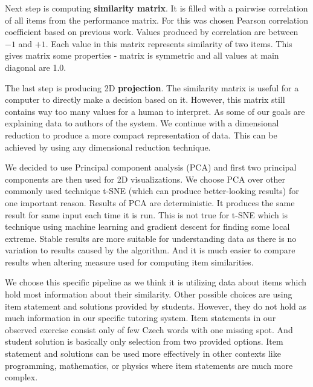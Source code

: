 \documentclass[
  digital, %
  table,   %
  nolof,     %
  nolot,     %
  nocover
]{fithesis3}
\begin{document}

Next step is computing \textbf{similarity matrix}. It is filled with a pairwise correlation of all items from the performance matrix. For this was chosen Pearson correlation coefficient based on previous work. Values produced by correlation are between $-1$ and $+1$. Each value in this matrix represents similarity of two items. This gives matrix some properties - matrix is symmetric and all values at main diagonal are 1.0.


The last step is producing 2D \textbf{projection}. The similarity matrix is useful for a computer to directly make a decision based on it. However, this matrix still contains way too many values for a human to interpret. As some of our goals are explaining data to authors of the system. We continue with a dimensional reduction to produce a more compact representation of data. This can be achieved by using any dimensional reduction technique.


We decided to use Principal component analysis (PCA) and first two principal components are then used for 2D visualizations. We choose PCA over other commonly used technique t-SNE (which can produce better-looking results) for one important reason. Results of PCA are deterministic. It produces the same result for same input each time it is run. This is not true for t-SNE which is technique using machine learning and gradient descent for finding some local extreme. Stable results are more suitable for understanding data as there is no variation to results caused by the algorithm. And it is much easier to compare results when altering measure used for computing item similarities.


We choose this specific pipeline as we think it is utilizing data about items which hold most information about their similarity. Other possible choices are using item statement and solutions provided by students. However, they do not hold as much information in our specific tutoring system. Item statements in our observed exercise consist only of few Czech words with one missing spot. And student solution is basically only selection from two provided options. Item statement and solutions can be used more effectively in other contexts like programming, mathematics, or physics where item statements are much more complex.
\end{document}
